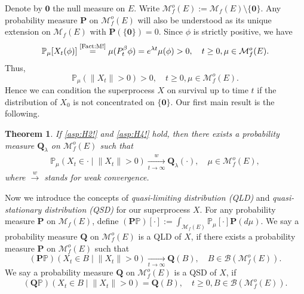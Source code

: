 \documentclass[12pt,a4paper]{amsart}
\numberwithin{equation}{section}
\theoremstyle{plain}
\newtheorem{thm}{Theorem}[section]
\theoremstyle{definition}
\theoremstyle{remark}
\begin{document}
	
	Denote by $\mathbf 0$ the null measure on $E$. 
	Write $\mathcal M_f^o(E) := \mathcal M_f(E)\setminus \{ \mathbf 0\}$. 
	Any probability measure $\mathbf P$ on $\mathcal M_f^o(E)$ will also be understood as its unique extension on $\mathcal M_f(E)$ with  $\mathbf P(\{\mathbf 0\}) = 0$. 
	Since $\phi$ is strictly positive, we have
\begin{equation}
	\mathbb P_\mu[X_t(\phi)]
	\overset{\text{\eqref{Fact:M!}}}= \mu(P_t^\beta \phi)
	=e^{\lambda t}\mu(\phi)>0, \quad t\geq 0, \mu \in \mathcal M_f^o(E).
\end{equation}
	Thus,
\begin{equation}  \label{lem:Nd!}
		\mathbb P_\mu(\|X_t\| > 0) > 0,\quad t\geq 0,\mu \in \mathcal M_f^o(E).
\end{equation}
Hence we can condition the superprocess $X$ on survival up to time $t$ if  the distribution of $X_0$ is not concentrated on $\{\mathbf 0\}$.
	Our first main result is the following.
	
\begin{thm} \label{Theorem:Y:H1:H2:H3:H4}
	If \eqref{asp:H2!} and \eqref{asp:H4!} hold, then there exists a probability measure $\mathbf Q_\lambda$
	on $\mathcal M_f^o(E)$ such that
\begin{align}
 	\mathbb P_\mu \left(X_t \in \cdot \middle| \|X_t\| > 0 \right) \xrightarrow[t\to \infty]{w} \mathbf Q_\lambda(\cdot),
 	\quad \mu \in \mathcal M_f^o(E),
\end{align}
	where $\xrightarrow{w}$ stands for weak convergence.
\end{thm}

	Now we introduce the concepts of \emph{quasi-limiting distribution (QLD)} and \emph{quasi-stationary distribution (QSD)} for our superprocess $X$.
	For any probability measure $\mathbf P$ on $\mathcal M_f(E)$, define $(\mathbf P\mathbb P)[\cdot] := \int_{\mathcal M_f(E)} \mathbb P_\mu[\cdot] \mathbf P(d\mu)$.
	We say a probability measure $\mathbf Q$ on $\mathcal M^o_f(E)$ is a QLD of $X$, if there exists a probability measure $\mathbf P$ on 
	$\mathcal M_f^o(E)$ such that
	\[
	(\mathbf P\mathbb P)\left(X_t \in B \middle| \|X_t\|>0\right) \xrightarrow[t\to \infty]{} \mathbf Q(B),
	\quad B\in \mathcal B(\mathcal M^o_f(E)).
	\]
	We say a probability measure $\mathbf Q$ on $\mathcal M^o_f(E)$ is a QSD of $X$, if
	\[
	(\mathbf Q \mathbb P) \left( X_t \in B \middle | \|X_t\|>0 \right) = \mathbf Q(B),
	\quad t\geq 0, B \in \mathcal B(\mathcal M^o_f(E)).
	\]
	
\end{document}
